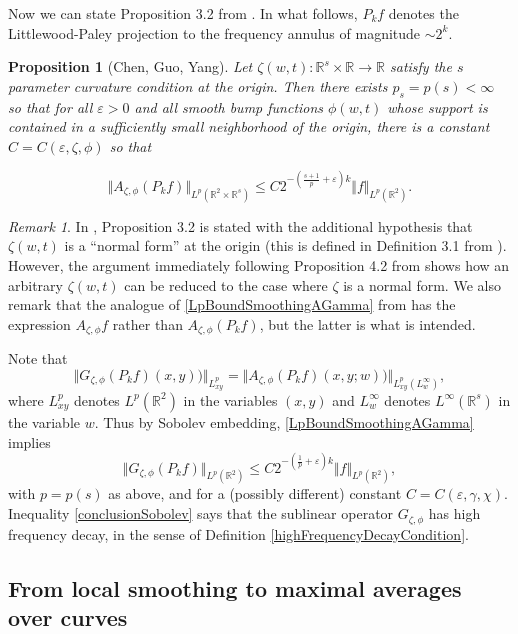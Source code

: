 \documentclass[letterpaper, reqno,11pt]{article}
\numberwithin{equation}{section}
\newcommand{\RR}{\mathbb{R}}
\newcommand{\eps}{\varepsilon}
\numberwithin{thm}{section}
\newtheorem{prop}[thm]{Proposition}
\theoremstyle{remark}
\newtheorem{rem}[thm]{Remark}
\begin{document}
Now we can state Proposition 3.2 from \cite{CGYv2}. In what follows, $P_kf$ denotes the Littlewood-Paley projection to the frequency annulus of magnitude $\sim 2^k$. 
%
\begin{prop}[Chen, Guo, Yang]\label{CGYProp}
Let $\zeta(w,t)\colon \RR^s\times\RR\to\RR$ satisfy the $s$ parameter curvature condition at the origin. Then there exists $p_s=p(s)<\infty$ so that for all $\eps>0$ and all smooth bump functions $\phi(w,t)$ whose support is contained in a sufficiently small neighborhood of the origin, there is a constant $C = C(\eps,\zeta, \phi)$ so that

\begin{equation}\label{LpBoundSmoothingAGamma}
\Vert A_{\zeta,\phi}(P_kf)\Vert_{L^p(\RR^2\times\RR^{s})}\leq C 2^{-(\frac{s+1}{p}+\eps)k}\Vert f \Vert_{L^p(\RR^2)}.
\end{equation}
\end{prop}
%
\begin{rem}
In \cite{CGYv2}, Proposition 3.2 is stated with the additional hypothesis that $\zeta(w,t)$ is a ``normal form'' at the origin (this is defined in Definition 3.1 from \cite{CGYv2}). However, the argument immediately following Proposition 4.2 from \cite{CGYv2} shows how an arbitrary  $\zeta(w,t)$ can be reduced to the case where $\zeta$ is a normal form. We also remark that the analogue of \eqref{LpBoundSmoothingAGamma} from \cite{CGYv2} has the expression $A_{\zeta,\phi}f$ rather than $A_{\zeta,\phi}(P_kf)$, but the latter is what is intended. 
\end{rem}

Note that
\[
\Vert G_{\zeta,\phi}(P_kf)(x,y))\Vert_{L^p_{xy}}=
\Vert A_{\zeta,\phi}(P_k f)(x,y;w))\Vert_{L^p_{xy}(L^\infty_{w})},
\]
where $L^p_{xy}$ denotes $L^p(\RR^2)$ in the variables $(x,y)$ and $L^\infty_{w}$ denotes $L^\infty(\RR^{s})$ in the variable $w$. Thus by Sobolev embedding, \eqref{LpBoundSmoothingAGamma} implies
\begin{equation}\label{conclusionSobolev}
\Vert G_{\zeta,\phi}(P_kf) \Vert_{L^p(\RR^2)}\leq C 2^{-(\frac{1}{p}+\eps)k}\Vert f \Vert_{L^p(\RR^2)},
\end{equation}
with $p=p(s)$ as above, and for a (possibly different) constant $C = C(\eps,\gamma,\chi)$. Inequality \eqref{conclusionSobolev} says that the sublinear operator $G_{\zeta,\phi}$ has high frequency decay, in the sense of Definition \ref{highFrequencyDecayCondition}.


\subsection{From local smoothing to maximal averages over curves}
\end{document}
